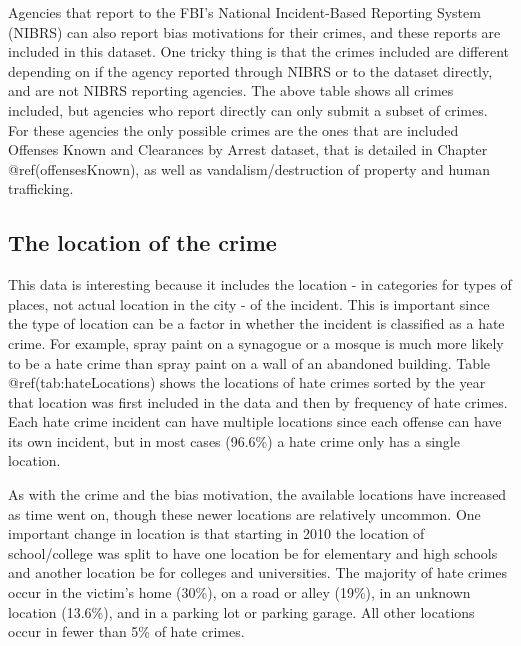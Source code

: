 \documentclass[
  12pt,
  openany]{book}
\begin{document}
Agencies that report to the FBI's National Incident-Based Reporting System (NIBRS) can also report bias motivations for their crimes, and these reports are included in this dataset. One tricky thing is that the crimes included are different depending on if the agency reported through NIBRS or to the dataset directly, and are not NIBRS reporting agencies. The above table shows all crimes included, but agencies who report directly can only submit a subset of crimes. For these agencies the only possible crimes are the ones that are included Offenses Known and Clearances by Arrest dataset, that is detailed in Chapter @ref(offensesKnown), as well as vandalism/destruction of property and human trafficking.

\hypertarget{the-location-of-the-crime}{%
\subsection{The location of the crime}\label{the-location-of-the-crime}}

This data is interesting because it includes the location - in categories for types of places, not actual location in the city - of the incident. This is important since the type of location can be a factor in whether the incident is classified as a hate crime. For example, spray paint on a synagogue or a mosque is much more likely to be a hate crime than spray paint on a wall of an abandoned building. Table @ref(tab:hateLocations) shows the locations of hate crimes sorted by the year that location was first included in the data and then by frequency of hate crimes. Each hate crime incident can have multiple locations since each offense can have its own incident, but in most cases (96.6\%) a hate crime only has a single location.

As with the crime and the bias motivation, the available locations have increased as time went on, though these newer locations are relatively uncommon. One important change in location is that starting in 2010 the location of school/college was split to have one location be for elementary and high schools and another location be for colleges and universities. The majority of hate crimes occur in the victim's home (30\%), on a road or alley (19\%), in an unknown location (13.6\%), and in a parking lot or parking garage. All other locations occur in fewer than 5\% of hate crimes.
\end{document}
